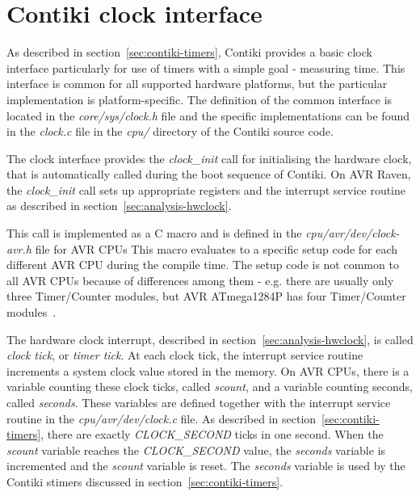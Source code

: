 
\section{Contiki clock interface}\label{sec:analysis-clock-interface}
As described in section~\ref{sec:contiki-timers},
Contiki provides a basic clock interface particularly for use of timers
with a simple goal - measuring time.
This interface is common for all supported hardware platforms,
but the particular implementation is platform-specific.
The definition of the common interface is located in the {\it{core/sys/clock.h}} file
and the specific implementations can be found in the {\it{clock.c}} file
in the {\it{cpu/}} directory of the Contiki source code.

The clock interface provides the {\it{clock\_init}} call for initialising the hardware clock,
that is automatically called during the boot sequence of Contiki.
On AVR Raven, the {\it{clock\_init}} call sets up
appropriate registers and the interrupt service routine as described in section~\ref{sec:analysis-hwclock}.

This call is implemented as a C macro and is defined in the {\it{cpu/avr/dev/clock-avr.h}} file for AVR CPUs
This macro evaluates to a specific setup code for each different AVR CPU during the compile time.
The setup code is not common to all AVR CPUs because of differences among them - e.g. there are usually
only three Timer/Counter modules, but AVR ATmega1284P has four Timer/Counter modules~\cite{avr-datasheet}.

The hardware clock interrupt, described in section~\ref{sec:analysis-hwclock},
is called {\it{clock tick}}, or {\it{timer tick}}.
At each clock tick, the interrupt service routine increments
a system clock value stored in the memory.
On AVR CPUs, there is a variable counting these clock ticks, called {\it{scount}},
and a variable counting seconds, called {\it{seconds}}.
These variables are defined together with the interrupt service routine in the {\it{cpu/avr/dev/clock.c}} file.
As described in section~\ref{sec:contiki-timers}, there are exactly {\it{CLOCK\_SECOND}} ticks in one second.
When the {\it{scount}} variable reaches the {\it{CLOCK\_SECOND}} value,
the {\it{seconds}} variable is incremented and the {\it{scount}} variable is reset.
The {\it{seconds}} variable is used by the Contiki stimers discussed in section~\ref{sec:contiki-timers}.

